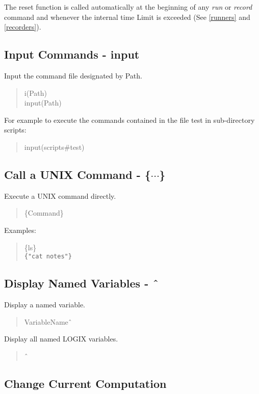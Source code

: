 \noindent
The reset function is called automatically at the beginning of
any {\em run} or {\em record} command and whenever the internal
time Limit is exceeded
(See \ref{runners} and  \ref{recorders}).

\subsection{Input Commands - input}

Input the command file designated by Path.  

\begin{verse}
    i(Path) \\
    input(Path)
\end{verse}

\noindent
For example to execute
the commands contained in the file test in sub-directory scripts:

\begin{verse}
    input(scripts\#test)
\end{verse}

\subsection{Call a UNIX Command - \{$\cdots$\}}

Execute a UNIX command directly.

\begin{verse}
    \{Command\}
\end{verse}

\noindent
Examples:

\begin{verse}
    \{ls\} \\
    \verb+{"cat notes"}+
\end{verse}

\subsection{Display Named Variables - \^\ }

Display a named variable.

\begin{verse}
    VariableName\^\ 
\end{verse}

\noindent
Display all named LOGIX variables.

\begin{verse}
    \^\ 
\end{verse}

\subsection{Change Current Computation  }

